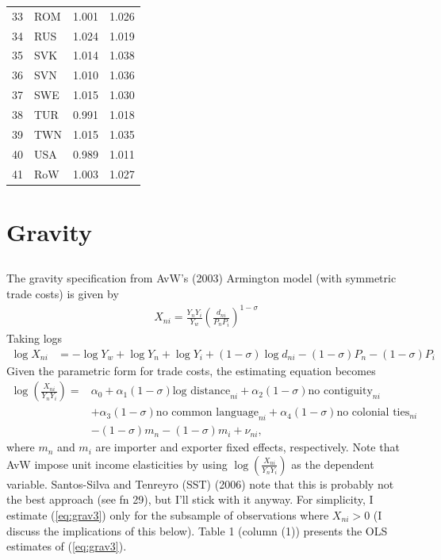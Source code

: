 \documentclass[12pt]{article}
\begin{document}
\begin{table}[!htpb]
\begin{tabular}{rlrr}
  33 & ROM & 1.001 & 1.026 \\ 
  34 & RUS & 1.024 & 1.019 \\ 
  35 & SVK & 1.014 & 1.038 \\ 
  36 & SVN & 1.010 & 1.036 \\ 
  37 & SWE & 1.015 & 1.030 \\ 
  38 & TUR & 0.991 & 1.018 \\ 
  39 & TWN & 1.015 & 1.035 \\ 
  40 & USA & 0.989 & 1.011 \\ 
  41 & RoW & 1.003 & 1.027 \\ 
   \hline
\end{tabular}
\end{table}

\newpage

\section{Gravity} 


\subsection{} The gravity specification from AvW's (2003) Armington model (with symmetric trade costs) is given by
\begin{align}
X_{ni} = \frac{Y_nY_i}{Y_w}\left(\frac{d_{ni}}{P_n P_i}\right)^{1-\sigma}  \label{eq:grav1}
\end{align}
Taking logs
\begin{align*}
\log X_{ni} &= - \log Y_w + \log Y_n + \log Y_i + (1-\sigma)\log d_{ni} - (1-\sigma)P_n - (1-\sigma)P_i 
\end{align*}
Given the parametric form for trade costs, the estimating equation becomes
\begin{align}
\log \left(\frac{X_{ni}}{Y_n Y_i}\right) =& \alpha_0 + \alpha_1 (1-\sigma) \text{log distance}_{ni} +  \alpha_2 (1-\sigma) \text{no contiguity}_{ni} \nonumber\\
&+ \alpha_3 (1-\sigma) \text{no common language}_{ni} + \alpha_4 (1-\sigma) \text{no colonial ties}_{ni} \nonumber\\
&- (1-\sigma)m_n - (1-\sigma)m_i + \nu_{ni}, \label{eq:grav3}
\end{align}
where $m_n$ and $m_i$ are importer and exporter fixed effects, respectively. Note that AvW impose unit income elasticities by using $\log \left(\frac{X_{ni}}{Y_n Y_i}\right)$ as the dependent variable. Santos-Silva and Tenreyro (SST) (2006) note that this is probably not the best approach (see fn 29), but I'll stick with it anyway. For simplicity, I estimate (\ref{eq:grav3}) only for the subsample of observations where $X_{ni} >0$ (I discuss the implications of this below). Table 1 (column (1)) presents the OLS estimates of (\ref{eq:grav3}).
\end{document}
